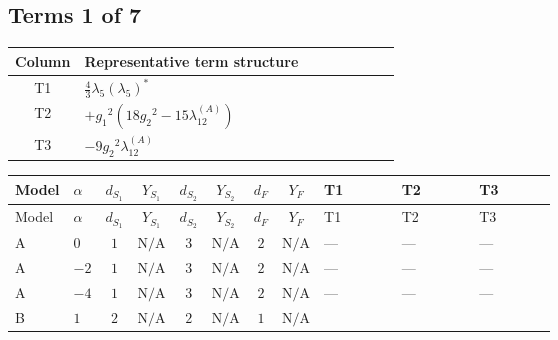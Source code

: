 \documentclass[8pt]{article}
\begin{document}
\begin{landscape}
\subsection*{Terms 1 of 7}
\begin{center}
\begin{tabular}{@{}c >{\raggedright\arraybackslash}p{0.82\linewidth}@{}}
\toprule
Column & Representative term structure \\
\midrule
T1 & \(\displaystyle \frac{4}{3} {\lambda_5} \left({\lambda_5}\right)^{*}\) \\
\midrule
T2 & \(\displaystyle +{g_1}^2 \left(18 {g_2}^2-15 {\lambda_{12}^{(A)}}\right)\) \\
\midrule
T3 & \(\displaystyle -9 {g_2}^2 {\lambda_{12}^{(A)}}\) \\
\midrule
\bottomrule
\end{tabular}
\end{center}
\smallskip
\tiny
\begin{longtable}{@{}llcccccc >{\raggedright\arraybackslash}p{0.21\linewidth} >{\raggedright\arraybackslash}p{0.21\linewidth} >{\raggedright\arraybackslash}p{0.21\linewidth}@{}}
\toprule
Model & $\alpha$ & $d_{S_1}$ & $Y_{S_1}$ & $d_{S_2}$ & $Y_{S_2}$ & $d_F$ & $Y_F$ & T1 & T2 & T3 \\
\midrule
\endfirsthead
\toprule
Model & $\alpha$ & $d_{S_1}$ & $Y_{S_1}$ & $d_{S_2}$ & $Y_{S_2}$ & $d_F$ & $Y_F$ & T1 & T2 & T3 \\
\midrule
\endhead
A & $0$ & $1$ & $\text{N/A}$ & $3$ & $\text{N/A}$ & $2$ & $\text{N/A}$ & --- & --- & --- \\
\midrule
A & $-2$ & $1$ & $\text{N/A}$ & $3$ & $\text{N/A}$ & $2$ & $\text{N/A}$ & --- & --- & --- \\
\midrule
A & $-4$ & $1$ & $\text{N/A}$ & $3$ & $\text{N/A}$ & $2$ & $\text{N/A}$ & --- & --- & --- \\
\midrule
B & $1$ & $2$ & $\text{N/A}$ & $2$ & $\text{N/A}$ & $1$ & $\text{N/A}$ & \scriptsize\adjustbox{max width=\linewidth}{$\begin{gathered} \frac{4}{3} {\lambda_5} \left({\lambda_5}\right)^{*}\end{gathered}$} & \scriptsize\adjustbox{max width=\linewidth}{$\begin{gathered} +{g_1}^2 \left(18 {g_2}^2-15 {\lambda_{12}^{(A)}}\right)\end{gathered}$} & \scriptsize\adjustbox{max width=\linewidth}{$\begin{gathered} -9 {g_2}^2 {\lambda_{12}^{(A)}}\end{gathered}$} \\

\end{longtable}
\end{landscape}
\end{document}
